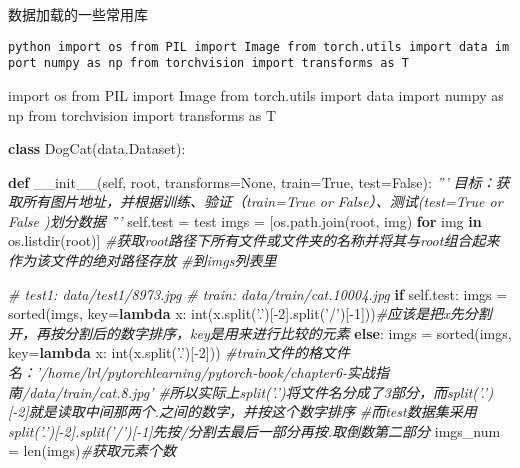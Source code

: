 \documentclass[11pt]{article}
\newenvironment{Shaded}{}{}
\newcommand{\KeywordTok}[1]{\textcolor[rgb]{0.00,0.44,0.13}{\textbf{{#1}}}}
\newcommand{\DecValTok}[1]{\textcolor[rgb]{0.25,0.63,0.44}{{#1}}}
\newcommand{\StringTok}[1]{\textcolor[rgb]{0.25,0.44,0.63}{{#1}}}
\newcommand{\CommentTok}[1]{\textcolor[rgb]{0.38,0.63,0.69}{\textit{{#1}}}}
\newcommand{\FunctionTok}[1]{\textcolor[rgb]{0.02,0.16,0.49}{{#1}}}
\newcommand{\NormalTok}[1]{{#1}}
\newcommand{\ImportTok}[1]{{#1}}
\newcommand{\VariableTok}[1]{\textcolor[rgb]{0.10,0.09,0.49}{{#1}}}
\newcommand{\ControlFlowTok}[1]{\textcolor[rgb]{0.00,0.44,0.13}{\textbf{{#1}}}}
\newcommand{\OperatorTok}[1]{\textcolor[rgb]{0.40,0.40,0.40}{{#1}}}
\newcommand{\BuiltInTok}[1]{{#1}}
\begin{document}
    数据加载的一些常用库

\texttt{python\ import\ os\ from\ PIL\ import\ Image\ from\ torch.utils\ import\ data\ import\ numpy\ as\ np\ from\ torchvision\ import\ transforms\ as\ T}

    \begin{Shaded}
\begin{Highlighting}[]
\ImportTok{import}\NormalTok{ os}
\ImportTok{from}\NormalTok{ PIL }\ImportTok{import}\NormalTok{ Image}
\ImportTok{from}\NormalTok{ torch.utils }\ImportTok{import}\NormalTok{ data}
\ImportTok{import}\NormalTok{ numpy }\ImportTok{as}\NormalTok{ np}
\ImportTok{from}\NormalTok{ torchvision }\ImportTok{import}\NormalTok{ transforms }\ImportTok{as}\NormalTok{ T}

\KeywordTok{class}\NormalTok{ DogCat(data.Dataset):}
    
    \KeywordTok{def} \FunctionTok{__init__}\NormalTok{(}\VariableTok{self}\NormalTok{, root, transforms}\OperatorTok{=}\VariableTok{None}\NormalTok{, train}\OperatorTok{=}\VariableTok{True}\NormalTok{, test}\OperatorTok{=}\VariableTok{False}\NormalTok{):}
        \CommentTok{'''}
\CommentTok{        目标：获取所有图片地址，并根据训练、验证（train=True or False）、测试(test=True or False )划分数据}
\CommentTok{        '''}
        \VariableTok{self}\NormalTok{.test }\OperatorTok{=}\NormalTok{ test}
\NormalTok{        imgs }\OperatorTok{=}\NormalTok{ [os.path.join(root, img) }\ControlFlowTok{for}\NormalTok{ img }\KeywordTok{in}\NormalTok{ os.listdir(root)] }\CommentTok{#获取root路径下所有文件或文件夹的名称并将其与root组合起来作为该文件的绝对路径存放                                                  #到imgs列表里}

        \CommentTok{# test1: data/test1/8973.jpg}
        \CommentTok{# train: data/train/cat.10004.jpg }
        \ControlFlowTok{if} \VariableTok{self}\NormalTok{.test:}
\NormalTok{            imgs }\OperatorTok{=} \BuiltInTok{sorted}\NormalTok{(imgs, key}\OperatorTok{=}\KeywordTok{lambda}\NormalTok{ x: }\BuiltInTok{int}\NormalTok{(x.split(}\StringTok{'.'}\NormalTok{)[}\OperatorTok{-}\DecValTok{2}\NormalTok{].split(}\StringTok{'/'}\NormalTok{)[}\OperatorTok{-}\DecValTok{1}\NormalTok{]))}\CommentTok{#应该是把x先分割开，再按分割后的数字排序，key是用来进行比较的元素}
        \ControlFlowTok{else}\NormalTok{:}
\NormalTok{            imgs }\OperatorTok{=} \BuiltInTok{sorted}\NormalTok{(imgs, key}\OperatorTok{=}\KeywordTok{lambda}\NormalTok{ x: }\BuiltInTok{int}\NormalTok{(x.split(}\StringTok{'.'}\NormalTok{)[}\OperatorTok{-}\DecValTok{2}\NormalTok{]))}
                \CommentTok{#train文件的格文件名：'/home/lrl/pytorchlearning/pytorch-book/chapter6-实战指南/data/train/cat.8.jpg'}
                \CommentTok{#所以实际上split('.')将文件名分成了3部分，而split('.')[-2]就是读取中间那两个.之间的数字，并按这个数字排序}
                \CommentTok{#而test数据集采用split('.')[-2].split('/')[-1]先按/分割去最后一部分再按.取倒数第二部分}
\NormalTok{        imgs_num }\OperatorTok{=} \BuiltInTok{len}\NormalTok{(imgs)}\CommentTok{#获取元素个数}
        

\end{Highlighting}
\end{Shaded}
\end{document}
